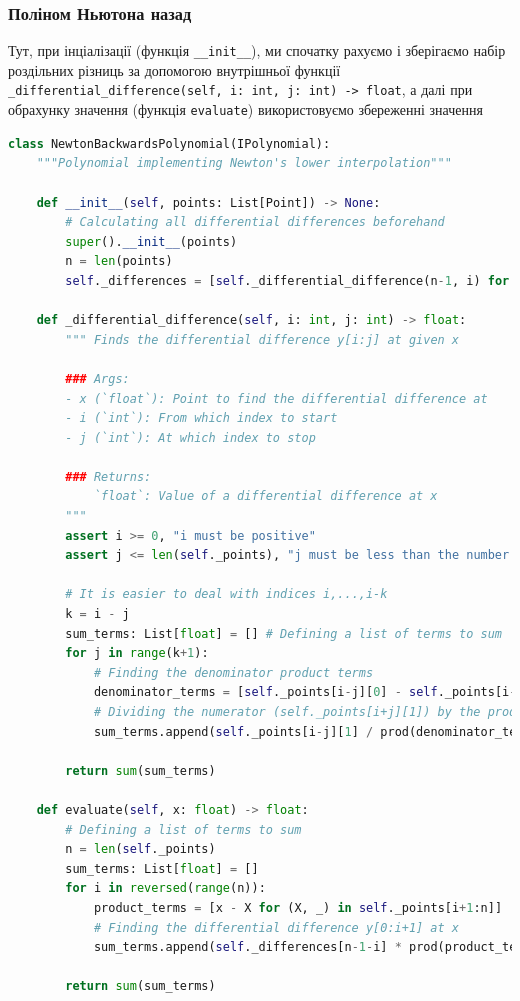 \documentclass[12pt]{extarticle}
\begin{document}
\subsubsection{Поліном Ньютона назад}

Тут, при інціалізації (функція \texttt{\_\_init\_\_}), ми спочатку рахуємо і зберігаємо набір роздільних різниць за допомогою внутрішньої функції \texttt{\_differential\_difference(self, i: int, j: int) -> float}, а далі при обрахунку значення (функція \texttt{evaluate}) використовуємо збереженні значення

\begin{lstlisting}[language=Python, caption=Реалізація полінома Ньютона назад]
class NewtonBackwardsPolynomial(IPolynomial):
    """Polynomial implementing Newton's lower interpolation"""
    
    def __init__(self, points: List[Point]) -> None:
        # Calculating all differential differences beforehand
        super().__init__(points)
        n = len(points)
        self._differences = [self._differential_difference(n-1, i) for i in reversed(range(n))]
        
    def _differential_difference(self, i: int, j: int) -> float:
        """ Finds the differential difference y[i:j] at given x

        ### Args:
        - x (`float`): Point to find the differential difference at
        - i (`int`): From which index to start
        - j (`int`): At which index to stop

        ### Returns:
            `float`: Value of a differential difference at x
        """
        assert i >= 0, "i must be positive"
        assert j <= len(self._points), "j must be less than the number of points"

        # It is easier to deal with indices i,...,i-k
        k = i - j
        sum_terms: List[float] = [] # Defining a list of terms to sum
        for j in range(k+1):
            # Finding the denominator product terms
            denominator_terms = [self._points[i-j][0] - self._points[i-l][0] for l in range(k+1) if l!=j]
            # Dividing the numerator (self._points[i+j][1]) by the product of denominator terms
            sum_terms.append(self._points[i-j][1] / prod(denominator_terms))
        
        return sum(sum_terms)
    
    def evaluate(self, x: float) -> float:
        # Defining a list of terms to sum
        n = len(self._points)
        sum_terms: List[float] = []
        for i in reversed(range(n)):
            product_terms = [x - X for (X, _) in self._points[i+1:n]]
            # Finding the differential difference y[0:i+1] at x
            sum_terms.append(self._differences[n-1-i] * prod(product_terms))
        
        return sum(sum_terms)
\end{lstlisting}
\end{document}
